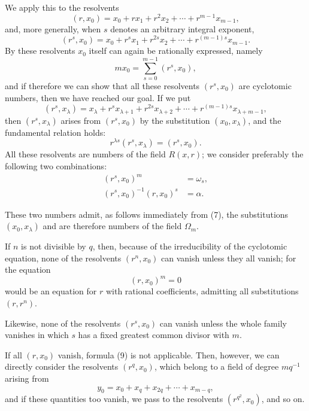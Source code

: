 \documentclass[11pt]{article}
\begin{document}
We apply this to the resolvents
\begin{equation}
  (r,x_0)=x_0+rx_1+r^2x_2+\cdots+r^{m-1}x_{m-1},
\tag{3}
\end{equation}
and, more generally, when $s$ denotes an arbitrary integral exponent,
\begin{equation}
  (r^s,x_0)=x_0+r^s x_1+r^{2s}x_2+\cdots+r^{(m-1)s}x_{m-1}.
\tag{4}
\end{equation}
By these resolvents $x_0$ itself can again be rationally expressed, namely
\begin{equation}
  m x_0=\sum_{s=0}^{m-1}(r^s,x_0),
\tag{5}
\end{equation}
and if therefore we can show that all these resolvents $(r^s,x_0)$ are cyclotomic numbers, then we have reached our goal. If we put
\begin{equation}
  (r^s,x_\lambda)=x_\lambda+r^s x_{\lambda+1}+r^{2s}x_{\lambda+2}+\cdots+r^{(m-1)s}x_{\lambda+m-1},
\tag{6}
\end{equation}
then $(r^s,x_\lambda)$ arises from $(r^s,x_0)$ by the substitution $(x_0,x_\lambda)$, and the fundamental relation holds:
\begin{equation}
  r^{\lambda s}(r^s,x_\lambda)=(r^s,x_0).
\tag{7}
\end{equation}
All these resolvents are numbers of the field $R(x,r)$; we consider preferably the following two combinations:
\begin{align}
  (r^s,x_0)^m &= \omega_s, \tag{8}\\
  (r^s,x_0)^{-1}(r,x_0)^s &= \alpha. \tag{9}
\end{align}

These two numbers admit, as follows immediately from (7), the substitutions $(x_0,x_\lambda)$ and are therefore numbers of the field $\Omega_m$.

If $n$ is not divisible by $q$, then, because of the irreducibility of the cyclotomic equation, none of the resolvents $(r^n,x_0)$ can vanish unless they all vanish; for the equation
\[
  (r,x_0)^m=0
\]
would be an equation for $r$ with rational coefficients, admitting all substitutions $(r,r^n)$.

Likewise, none of the resolvents $(r^s,x_0)$ can vanish unless the whole family vanishes in which $s$ has a fixed greatest common divisor with $m$.

If all $(r,x_0)$ vanish, formula (9) is not applicable. Then, however, we can directly consider the resolvents $(r^q,x_0)$, which belong to a field of degree $m q^{-1}$ arising from
\[
  y_0=x_0+x_q+x_{2q}+\cdots+x_{m-q},
\]
and if these quantities too vanish, we pass to the resolvents $(r^{q^2},x_0)$, and so on.
\end{document}
